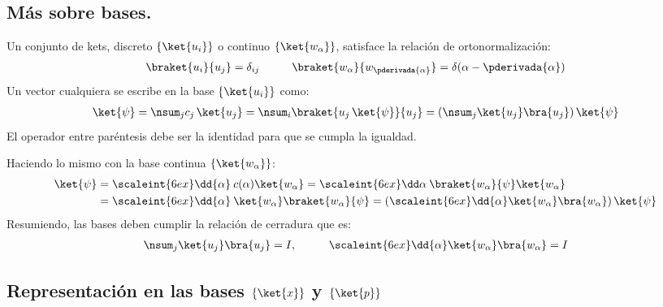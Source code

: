 \subsection*{Más sobre bases.}

Un conjunto de kets, discreto $\{ \ket{u_{i}} \}$ o continuo $\{ \ket{w_{\alpha}} \}$, satisface la relación de ortonormalización:
\begin{align*}
\braket{u_{i}}{u_{j}} = \delta_{ij} \hspace{1cm} \braket{w_{\alpha}}{w_{\pderivada{\alpha}}} = \delta(\alpha - \pderivada{\alpha})
\end{align*}
Un vector cualquiera se escribe en la base $\{ \ket{u_{i}} \}$ como:
\begin{align*}
\ket{\psi} =  \nsum_{j} c_{j} \, \ket{u_{j}} = \nsum_{i} \braket{u_{j} \, \ket{\psi}}{u_{j}} = \left( \nsum_{j} \ket{u_{j}} \bra{u_{j}} \right) \ket{\psi}
\end{align*}
El operador entre paréntesis debe ser la identidad para que se cumpla la igualdad.
\par
Haciendo lo mismo con la base continua $\{ \ket{w_{\alpha}} \}$:
\begin{align*}
\ket{\psi} &= \scaleint{6ex} \dd{\alpha} \: c (\alpha) \ket{w_{\alpha}} = \scaleint{6ex} \dd \alpha \: \braket{w_{\alpha}}{\psi} \ket{w_{\alpha}} \\
&= \scaleint{6ex} \dd{\alpha} \: \ket{w_{\alpha}} \braket{w_{\alpha}}{\psi} = \left( \scaleint{6ex} \dd{\alpha} \ket{w_{\alpha}} \bra{w_{\alpha}} \right) \ket{\psi} 
\end{align*}
Resumiendo, las bases deben cumplir la relación de cerradura que es:
\begin{align*}
\nsum_{j} \ket{u_{j}} \bra{u_{j}} = I, \hspace{1cm} \scaleint{6ex} \dd{\alpha} \ket{w_{\alpha}} \bra{w_{\alpha}} = I \end{align*}

\subsection{Representación en las bases \texorpdfstring{$\{\ket{x}\}$}{x} y \texorpdfstring{$\{ \ket{p}\}$}{p}}

